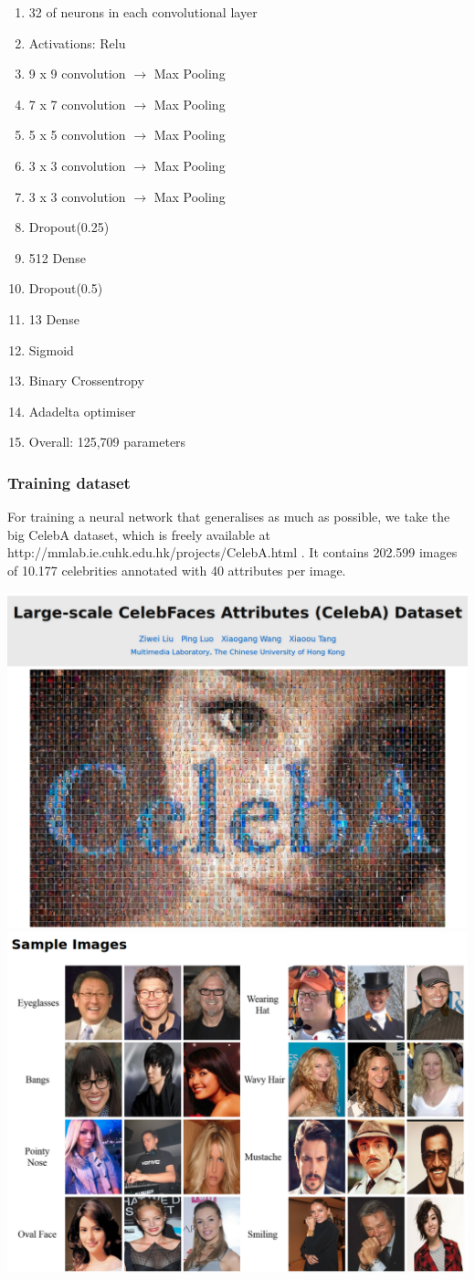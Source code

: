 \documentclass[12.5pt]{scrartcl}
\begin{document}
	\begin{enumerate}
		\item 	32 of neurons in each convolutional layer
		\item Activations: Relu
		\item 9 x 9 convolution $\rightarrow$ Max Pooling
		\item	7 x 7 convolution $\rightarrow$  Max Pooling
		\item	5 x 5 convolution $\rightarrow$  Max Pooling
		\item	3 x 3 convolution $\rightarrow$  Max Pooling
		\item	3 x 3 convolution $\rightarrow$  Max Pooling
		\item	Dropout(0.25)
		\item	512 Dense
		\item	Dropout(0.5)
		\item	13 Dense
		\item	Sigmoid
		\item	Binary Crossentropy
		\item	Adadelta optimiser
		\item Overall: 125,709 parameters
	\end{enumerate}

	\subsubsection{Training dataset}
	For training a neural network that generalises as much as possible, we take the big CelebA dataset, which is freely available at http://mmlab.ie.cuhk.edu.hk/projects/CelebA.html . It contains 202.599 images of 10.177 celebrities annotated with 40 attributes per image.

	\includegraphics[width=0.5\linewidth]{images/CelebA} \\
	\includegraphics[width=0.5\linewidth]{images/CelebAExamples}
	
\end{document}
